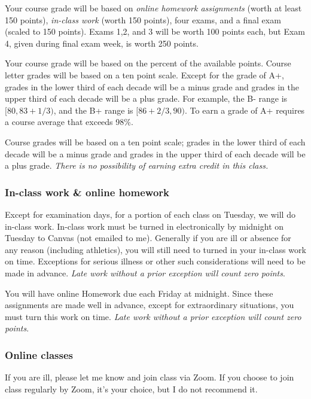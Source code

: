 \documentclass[12pt,fullpage]{article}
\newcounter{ex}\setcounter{ex}{0}
\begin{document}
Your course grade will be based on \emph{online homework assignments} (worth at least 150 points), \emph{in-class work} (worth  150 points),  four exams, and a final
exam (scaled to 150 points).   Exams 1,2, and 3 will be worth 100 points each, but Exam 4, given during final exam week, is worth 250 points.

Your course grade will be based on the percent of the available points. Course letter grades will be based on a ten point scale. Except for the grade of A+, grades in the lower third of each decade will be a minus grade and grades in the upper third of each decade will be a plus grade. For example, the B- range is $[80, 83 + 1/3)$, and the B+ range is $[86 + 2/3, 90)$. To earn a grade of A+ requires a course average that exceeds 98\%.

Course grades will be based on a ten point scale; grades in the lower third of each decade will be a minus grade and grades in the upper third of each decade will be a plus grade. \emph{There is no possibility of earning extra credit in this class.}


\subsubsection*{In-class work \& online homework}

Except for examination days, for a portion of each class on Tuesday, we will do in-class work.  In-class work must be turned in electronically by midnight on Tuesday to Canvas (not emailed to me).  Generally if you are ill or absence for any reason (including athletics), you will still need to turned in your in-class work on time. Exceptions for serious illness or other such considerations will need to be made in advance. \emph{Late work without a prior exception will count zero points}.

You will have online Homework due each Friday at midnight. Since these assignments are made well in advance, except for extraordinary situations, you must turn this work on time.   \emph{Late work without a prior exception will count zero points}.


\subsubsection*{Online classes}

If you are ill, please let me know and join class via Zoom. If you choose to join class regularly by Zoom, it's your choice, but I do not recommend it.
\end{document}
